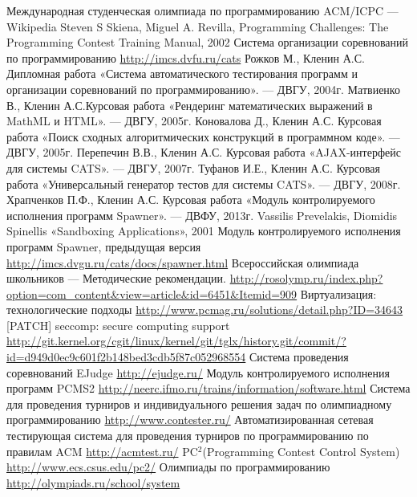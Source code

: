 \documentclass{imcs}
\begin{document}
\begin{thebibliography}{99}
 Международная студенческая олимпиада по программированию ACM/ICPC --- Wikipedia
 Steven S Skiena, Miguel A. Revilla, Programming Challenges: The Programming Contest Training Manual, 2002
 Система организации соревнований по программированию \url{http://imcs.dvfu.ru/cats}
 Рожков М., Кленин А.С. Дипломная работа «Система автоматического тестирования программ и организации соревнований по программированию». --- ДВГУ, 2004г.
 Матвиенко В., Кленин А.С.Курсовая работа «Рендеринг математических выражений в MathML и HTML». --- ДВГУ, 2005г.
 Коновалова Д., Кленин А.С. Курсовая работа «Поиск сходных алгоритмических конструкций в программном коде». --- ДВГУ, 2005г.
 Перепечин В.В., Кленин А.С. Курсовая работа «AJAX-интерфейс для системы CATS». --- ДВГУ, 2007г.
 Туфанов И.Е., Кленин А.С. Курсовая работа «Универсальный генератор тестов для системы CATS». --- ДВГУ, 2008г.
 Храпченков П.Ф., Кленин А.С. Курсовая работа «Модуль контролируемого исполнения программ Spawner». --- ДВФУ, 2013г.
 Vassilis Prevelakis, Diomidis Spinellis «Sandboxing Applications», 2001
 Модуль контролируемого исполнения программ Spawner, предыдущая версия \url{http://imcs.dvgu.ru/cats/docs/spawner.html}
 Всероссийская олимпиада школьников --- Методические рекомендации. \url{http://rosolymp.ru/index.php?option=com_content&view=article&id=6451&Itemid=909}
 Виртуализация: технологические подходы \url{http://www.pcmag.ru/solutions/detail.php?ID=34643}
 [PATCH] seccomp: secure computing support \url{http://git.kernel.org/cgit/linux/kernel/git/tglx/history.git/commit/?id=d949d0ec9c601f2b148bed3cdb5f87c052968554}
 Система проведения соревнований EJudge \url{http://ejudge.ru/}
 Модуль контролируемого исполнения программ PCMS2 \url{http://neerc.ifmo.ru/trains/information/software.html}
 Система для проведения турниров и индивидуального решения задач по олимпиадному программированию \url{http://www.contester.ru/}
 Автоматизированная сетевая тестирующая система для проведения турниров по программированию по правилам ACM \url{http://acmtest.ru/}
 PC$^2$(Programming Contest Control System) \url{http://www.ecs.csus.edu/pc2/}
 Олимпиады по программированию \url{http://olympiads.ru/school/system
}
\end{thebibliography}
\end{document}
